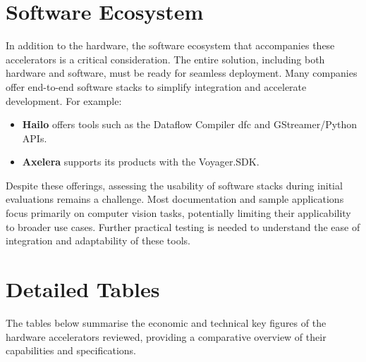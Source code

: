 \section{Software Ecosystem}
In addition to the hardware, the software ecosystem that accompanies these accelerators is a critical consideration. The entire solution, including both hardware and software, must be ready for seamless deployment. Many companies offer end-to-end software stacks to simplify integration and accelerate development. For example:
\begin{itemize}
    \item \textbf{Hailo} offers tools such as the Dataflow Compiler \acrshort{dfc} and GStreamer/Python APIs.
    \item \textbf{Axelera} supports its products with the Voyager.SDK.
\end{itemize}

Despite these offerings, assessing the usability of software stacks during initial evaluations remains a challenge. Most documentation and sample applications focus primarily on computer vision tasks, potentially limiting their applicability to broader use cases. Further practical testing is needed to understand the ease of integration and adaptability of these tools.

\section{Detailed Tables}
The tables below summarise the economic and technical key figures of the hardware accelerators reviewed, providing a comparative overview of their capabilities and specifications.

